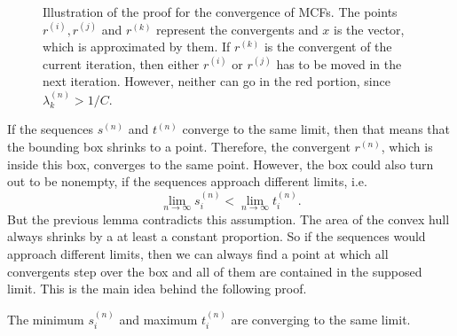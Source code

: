 \begin{figure}[tbp]
  \centering
  
  \caption{
    Illustration of the proof for the convergence of MCFs.
    The points $r^{(i)}, r^{(j)}$ and $r^{(k)}$ represent the convergents and $x$ is
    the vector, which is approximated by them.
    If $r^{(k)}$ is the convergent of the current iteration,
    then either $r^{(i)}$ or $r^{(j)}$ has to be moved in the next iteration.
    However, neither can go in the red portion, since $λ_k^{(n)} > 1/C$.
  }
  \label{fig:convergence}
\end{figure}

If the sequences $s^{(n)}$ and $t^{(n)}$ converge to the same limit,
then that means that the bounding box shrinks to a point.
Therefore, the convergent $r^{(n)}$, which is inside this box, converges to the
same point.
However, the box could also turn out to be nonempty,
if the sequences approach different limits, i.e.
\[
  \lim_{n → ∞} s_i^{(n)} < \lim_{n → ∞} t_i^{(n)}.
\]
But the previous lemma contradicts this assumption.
The area of the convex hull always shrinks by a at least a constant proportion.
So if the sequences would approach different limits, then we can always find a
point at which all convergents step over the box and all of them are contained
in the supposed limit.
This is the main idea behind the following proof.

\begin{lemma}
  \label{lem:min-max-conv}
  The minimum $s_i^{(n)}$ and maximum $t_i^{(n)}$ are converging to the same
  limit.
\end{lemma}

